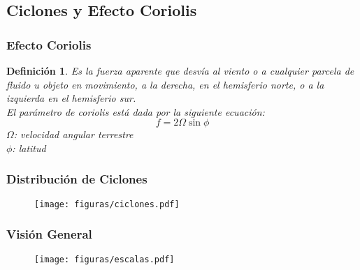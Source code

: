 \documentclass{beamer}
\newtheorem{Th1}{Reseña Historica}
\newtheorem{Th2}{Definición}
\begin{document}
\subsection{Ciclones y Efecto Coriolis }
\begin{frame}
\frametitle{Efecto Coriolis}
\begin{Th2}
Es la fuerza aparente que desvía al viento o a cualquier parcela de fluido u objeto en
movimiento, a la derecha, en el hemisferio norte, o a la izquierda en el hemisferio sur.\\
El parámetro de coriolis está dada por la siguiente ecuación: 
\begin{equation}
f=2\Omega\sin\phi
\end{equation}
$\Omega$: velocidad angular terrestre \\
$\phi$: latitud
\end{Th2}
\end{frame} 

\begin{frame}
\frametitle{Distribución de Ciclones}
\begin{figure}[!hbt]
   \centering
   \texttt{[image: figuras/ciclones.pdf]}
\end{figure}
\end{frame}

\begin{frame}
\frametitle{Visión General}
\begin{figure}[!hbt]
   \centering
   \texttt{[image: figuras/escalas.pdf]}
\end{figure}
\end{frame}
 
\end{document}
